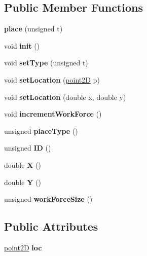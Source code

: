 \subsection*{Public Member Functions}
\begin{DoxyCompactItemize}
\item 
\mbox{\label{classplace_ade1afd10cb254434214fb43d95dd6a4f}} 
{\bfseries place} (unsigned t)
\item 
\mbox{\label{classplace_a88cfb493e57ceabe0753ab98b2e6dac5}} 
void {\bfseries init} ()
\item 
\mbox{\label{classplace_a3b3fd9f79977012225fefffaf0e5f5d4}} 
void {\bfseries set\+Type} (unsigned t)
\item 
\mbox{\label{classplace_a67e4c5da30e53886486fe8ec57467ed2}} 
void {\bfseries set\+Location} (\mbox{\hyperlink{classpoint2D}{point2D}} p)
\item 
\mbox{\label{classplace_a2175356d103d8aedb4c355d7436f9d56}} 
void {\bfseries set\+Location} (double x, double y)
\item 
\mbox{\label{classplace_acc6dddccc006b7587ac99d083f22ce4d}} 
void {\bfseries increment\+Work\+Force} ()
\item 
\mbox{\label{classplace_a327ed403446309536953b7cf9ba51fe2}} 
unsigned {\bfseries place\+Type} ()
\item 
\mbox{\label{classplace_af0d1fb750a7f800a4ae8245932a1709c}} 
unsigned {\bfseries ID} ()
\item 
\mbox{\label{classplace_ab63a396b9781a5f7d69a9f7b5ce32a1e}} 
double {\bfseries X} ()
\item 
\mbox{\label{classplace_a4104729bc9904da36159775a7cf5ce1e}} 
double {\bfseries Y} ()
\item 
\mbox{\label{classplace_a06933a289fc55df54c622725e4227003}} 
unsigned {\bfseries work\+Force\+Size} ()
\end{DoxyCompactItemize}
\subsection*{Public Attributes}
\begin{DoxyCompactItemize}
\item 
\mbox{\label{classplace_a30abc26da34316006bac7d17398f0076}} 
\mbox{\hyperlink{classpoint2D}{point2D}} {\bfseries loc}
\end{DoxyCompactItemize}
